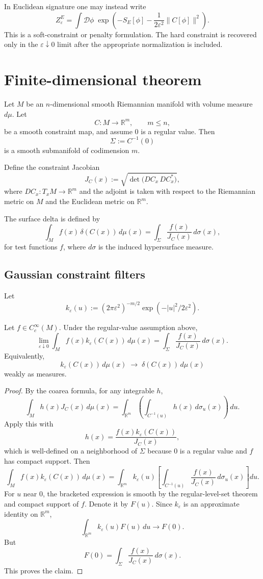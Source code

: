 \documentclass[11pt]{article}
\begin{document}
In Euclidean signature one may instead write
\[
Z_\varepsilon^{E}
=
\int \mathcal D\phi\;
\exp\!\left(
-S_E[\phi]
-\frac{1}{2\varepsilon^2}\|C[\phi]\|^2
\right).
\]
This is a soft-constraint or penalty formulation.  The hard constraint is recovered only in
the \(\varepsilon\downarrow0\) limit after the appropriate normalization is included.

\section{Finite-dimensional theorem}

Let \(M\) be an \(n\)-dimensional smooth Riemannian manifold with volume measure \(d\mu\).
Let
\[
C:M\to\mathbb R^m,\qquad m\le n,
\]
be a smooth constraint map, and assume \(0\) is a regular value.  Then
\[
\Sigma:=C^{-1}(0)
\]
is a smooth submanifold of codimension \(m\).

Define the constraint Jacobian
\[
J_C(x):=\sqrt{\det\bigl(DC_x\,DC_x^{\ast}\bigr)},
\]
where \(DC_x:T_xM\to\mathbb R^m\) and the adjoint is taken with respect to the Riemannian
metric on \(M\) and the Euclidean metric on \(\mathbb R^m\).

The surface delta is defined by
\[
\int_M f(x)\,\delta(C(x))\,d\mu(x)
=
\int_{\Sigma}\frac{f(x)}{J_C(x)}\,d\sigma(x),
\]
for test functions \(f\), where \(d\sigma\) is the induced hypersurface measure.

\subsection{Gaussian constraint filters}

Let
\[
k_\varepsilon(u):=(2\pi\varepsilon^2)^{-m/2}\exp(-|u|^2/2\varepsilon^2).
\]

\begin{theorem}
Let \(f\in C_c^\infty(M)\).  Under the regular-value assumption above,
\[
\lim_{\varepsilon\downarrow0}
\int_M f(x) k_\varepsilon(C(x))\,d\mu(x)
=
\int_{\Sigma}\frac{f(x)}{J_C(x)}\,d\sigma(x).
\]
Equivalently,
\[
k_\varepsilon(C(x))\,d\mu(x)\;\longrightarrow\;\delta(C(x))\,d\mu(x)
\]
weakly as measures.
\end{theorem}

\begin{proof}
By the coarea formula, for any integrable \(h\),
\[
\int_M h(x)J_C(x)\,d\mu(x)
=
\int_{\mathbb R^m}
\left(\int_{C^{-1}(u)} h(x)\,d\sigma_u(x)\right)\,du .
\]
Apply this with
\[
h(x)=\frac{f(x)k_\varepsilon(C(x))}{J_C(x)} ,
\]
which is well-defined on a neighborhood of \(\Sigma\) because \(0\) is a regular value and
\(f\) has compact support.  Then
\[
\int_M f(x)k_\varepsilon(C(x))\,d\mu(x)
=
\int_{\mathbb R^m} k_\varepsilon(u)
\left[
\int_{C^{-1}(u)}
\frac{f(x)}{J_C(x)}\,d\sigma_u(x)
\right]du .
\]
For \(u\) near \(0\), the bracketed expression is smooth by the regular-level-set theorem
and compact support of \(f\).  Denote it by \(F(u)\).  Since \(k_\varepsilon\) is an approximate
identity on \(\mathbb R^m\),
\[
\int_{\mathbb R^m} k_\varepsilon(u)F(u)\,du\to F(0).
\]
But
\[
F(0)=\int_{\Sigma}\frac{f(x)}{J_C(x)}\,d\sigma(x).
\]
This proves the claim.
\end{proof}
\end{document}
